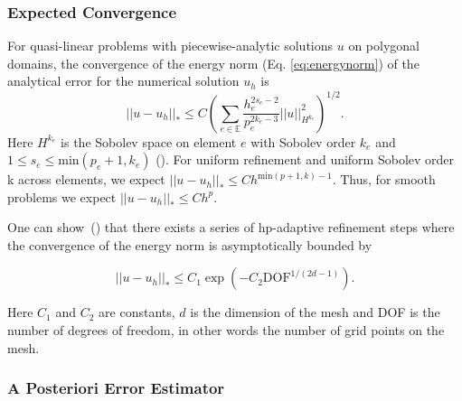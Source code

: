 \subsubsection{Expected Convergence}
\label{sec:expectedconvergence}

 For quasi-linear problems with piecewise-analytic solutions $u$ on polygonal domains, the convergence of the energy norm (Eq. \ref{eq:energynorm}) of the analytical error for the numerical solution $u_h$ is
% 
 \begin{equation}
 \label{eq:expectedconvergence}
 || u - u_h ||_* \leq C\left( \sum\limits_{e \in \mathbb{E}} \frac{ h_e^{2s_e - 2}}{ p_e^{2k_e -3}} ||u||^2_{H^{k_e}} \right)^{1/2}.
 \end{equation}
%
 Here ${H^{k_{e}}}$ is the Sobolev space on element $e$ with Sobolev order $k_{e}$ and $1 \leq s_{e} \leq \text{min}(p_{e}+1, k_{e})$ (\citet*{houston2007energy, houston2008posteriori,houston2005discontinuous, bi2015posteriori}). For uniform refinement and uniform Sobolev order k across elements, we expect $|| u - u_h ||_* \leq Ch^{\text{min}(p+1, k) - 1}$. Thus, for smooth problems we expect $|| u - u_h ||_* \leq Ch^{p}$.

 One can show~(\citet*{schotzau2014exponential}) that there exists a series of hp-adaptive refinement steps where the convergence of the energy norm is asymptotically bounded by
 
  \begin{equation}
 \label{eq:expconvergence}
 ||u-u_{h}||_{*} \leq C_{1}\exp(-C_{2}\text{DOF}^{1/(2d-1)}). 
\end{equation}

Here $C_{1}$ and $C_{2}$ are constants, $d$ is the dimension of the mesh and DOF is the number of degrees of freedom, in other words the number of grid points on the mesh.


\subsubsection{A Posteriori Error Estimator}

